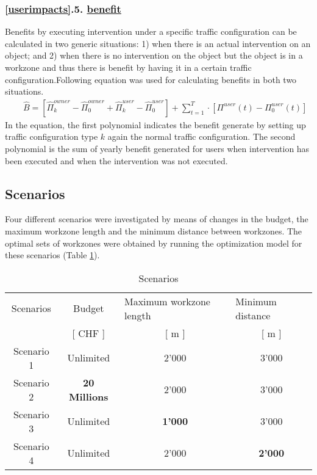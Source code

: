 \documentclass[a4paper,3p,times,authoryear]{elsarticle}
\begin{document}
\subsubsection*{\ref{userimpacts}.5. \underline{benefit}}
Benefits by executing intervention under a specific traffic configuration can be calculated in two generic situations: 1) when there is an actual intervention on an object; and 2) when there is no intervention on the object but the object is in a workzone and thus there is benefit by having it in a certain traffic configuration.Following equation was used for calculating benefits in both two situations.
\begin{eqnarray}
      && \hat B=  \left[\hat \Pi^{owner}_k-\hat \Pi^{owner}_0  + \hat \Pi^{user}_k-\hat \Pi^{user}_0 \right] +\sum_{t=1}^T \cdot \left[\Pi^{user}(t)-\Pi^{user}_0(t)  \right] \label{benefitintervention} 
\end{eqnarray}
In the equation, the first polynomial indicates the benefit generate by setting up traffic configuration type $k$ again the normal traffic configuration. The second polynomial is the sum of yearly benefit generated for users when intervention has been executed and when the intervention was not executed.
%
\subsection{Scenarios}
Four different scenarios were investigated by means of changes in the budget,
the maximum workzone length and the minimum distance between workzones. The
optimal sets of workzones were obtained by running the optimization model for
these scenarios (Table \ref{tbl:ex2}).
\begin{table}[H]
\centering
\caption{Scenarios} \label{tbl:ex2}
\begin{tabular}{|l|l|l|l|}
\hline
\multicolumn{1}{|c|}{Scenarios} & \multicolumn{1}{c|}{Budget} & \multicolumn{1}{m{1.5cm}|}{ \centering Maximum workzone length} & \multicolumn{1}{m{1.5cm}|}{ \centering Minimum distance }  \\ 
\multicolumn{1}{|c|}{} & \multicolumn{1}{c|}{[ CHF ]} & \multicolumn{1}{c|}{[ m ]} & \multicolumn{1}{c|}{[ m ]} \\ 
\hline
\multicolumn{1}{|c|}{Scenario 1} & \multicolumn{1}{c|}{Unlimited} & \multicolumn{1}{c|}{2'000} & \multicolumn{1}{c|}{3'000} \\ 
\hline
\multicolumn{1}{|c|}{Scenario 2} & \multicolumn{1}{c|}{\textbf{20 Millions}} & \multicolumn{1}{c|}{2'000} & \multicolumn{1}{c|}{3'000} \\ 
\hline
\multicolumn{1}{|c|}{Scenario 3} & \multicolumn{1}{c|}{Unlimited} & \multicolumn{1}{c|}{\textbf{1'000}} & \multicolumn{1}{c|}{3'000} \\ 
\hline
\multicolumn{1}{|c|}{Scenario 4} & \multicolumn{1}{c|}{Unlimited} & \multicolumn{1}{c|}{2'000} & \multicolumn{1}{c|}{\textbf{2'000}} \\ 
\hline
\end{tabular}
\end{table}
\end{document}
